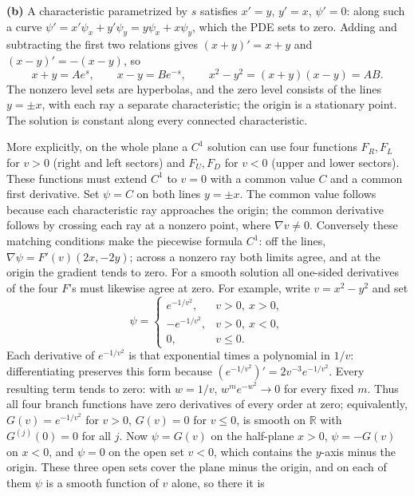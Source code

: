 \textbf{(b)} A characteristic parametrized by $s$ satisfies
$x'=y$, $y'=x$, $\psi'=0$: along such a curve
$\psi'=x'\psi_x+y'\psi_y=y\psi_x+x\psi_y$, which the PDE sets to zero.
Adding and subtracting the first two relations gives
$(x+y)'=x+y$ and $(x-y)'=-(x-y)$, so
\[
x+y=Ae^s,\qquad x-y=Be^{-s},\qquad x^2-y^2=(x+y)(x-y)=AB.
\]
The nonzero level sets are hyperbolas, and the zero level consists of
the lines $y=\pm x$, with each ray a separate characteristic; the
origin is a stationary point.  The solution is constant along every
connected characteristic.

More explicitly, on the whole plane a $C^1$ solution can use four
functions $F_R,F_L$ for $v>0$ (right and left sectors) and $F_U,F_D$
for $v<0$ (upper and lower sectors).  These functions must extend
$C^1$ to $v=0$ with a common value $C$ and a common first derivative.
Set $\psi=C$ on both lines $y=\pm x$.  The common value follows because
each characteristic ray approaches the origin; the common derivative
follows by crossing each ray at a nonzero point, where $\nabla v\ne0$.
Conversely these matching conditions make the piecewise formula $C^1$:
off the lines, $\nabla\psi=F'(v)(2x,-2y)$; across a nonzero ray both
limits agree, and at the origin the gradient tends to zero.
For a smooth solution all one-sided derivatives of the four $F$'s
must likewise agree at zero.
For example, write $v=x^2-y^2$ and set
\[
\psi=\begin{cases}
 e^{-1/v^2},&v>0,\ x>0,\\
 -e^{-1/v^2},&v>0,\ x<0,\\
 0,&v\le0.
\end{cases}
\]
Each derivative of $e^{-1/v^2}$ is that exponential times a polynomial
in $1/v$: differentiating preserves this form because
$(e^{-1/v^2})'=2v^{-3}e^{-1/v^2}$.  Every resulting term tends to zero:
with $w=1/v$, $w^m e^{-w^2}\to0$ for every fixed $m$.
Thus all four branch functions have zero derivatives of every order at
zero; equivalently, $G(v)=e^{-1/v^2}$ for $v>0$, $G(v)=0$ for $v\le0$,
is smooth on $\mathbb R$ with $G^{(j)}(0)=0$ for all $j$.
Now $\psi=G(v)$ on the half-plane $x>0$, $\psi=-G(v)$ on $x<0$, and
$\psi=0$ on the open set $v<0$, which contains the $y$-axis minus the
origin.  These three open sets cover the plane minus the origin, and on
each of them $\psi$ is a smooth function of $v$ alone, so there it is

